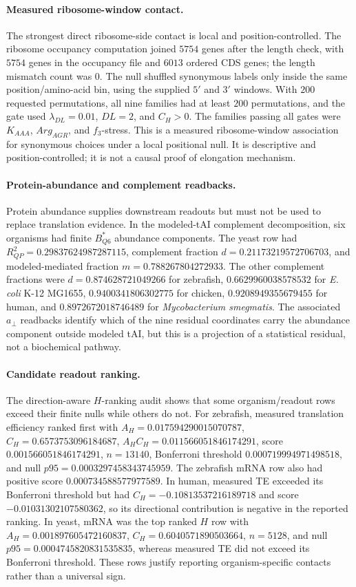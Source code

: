 \paragraph{Measured ribosome-window contact.}
The strongest direct ribosome-side contact is local and position-controlled. The ribosome occupancy computation joined $5754$ genes after the length check, with $5754$ genes in the occupancy file and $6013$ ordered CDS genes; the length mismatch count was $0$. The null shuffled synonymous labels only inside the same position/amino-acid bin, using the supplied $5'$ and $3'$ windows. With $200$ requested permutations, all nine families had at least $200$ permutations, and the gate used $\lambda_{DL}=0.01$, $DL=2$, and $C_H>0$. The families passing all gates were $K_{AAA}$, $Arg_{AGR}$, and $f_3$-stress. This is a measured ribosome-window association for synonymous choices under a local positional null. It is descriptive and position-controlled; it is not a causal proof of elongation mechanism.

\paragraph{Protein-abundance and complement readbacks.}
Protein abundance supplies downstream readouts but must not be used to replace translation evidence. In the modeled-tAI complement decomposition, six organisms had finite $B^{*}_{Q6}$ abundance components. The yeast row had $R^2_{QP}=0.29837624987287115$, complement fraction $d=0.21173219572706703$, and modeled-mediated fraction $m=0.788267804272933$. The other complement fractions were $d=0.874628721049266$ for zebrafish, $0.6629960038578532$ for \textit{E. coli} K-12 MG1655, $0.9400341806302775$ for chicken, $0.9208949355679455$ for human, and $0.8972672018746489$ for \textit{Mycobacterium smegmatis}. The associated $a_{\perp}$ readbacks identify which of the nine residual coordinates carry the abundance component outside modeled tAI, but this is a projection of a statistical residual, not a biochemical pathway.

\paragraph{Candidate readout ranking.}
The direction-aware $H$-ranking audit shows that some organism/readout rows exceed their finite nulls while others do not. For zebrafish, measured translation efficiency ranked first with $A_H=0.017594290015070787$, $C_H=0.6573753096184687$, $A_HC_H=0.011566051846174291$, score $0.001566051846174291$, $n=13140$, Bonferroni threshold $0.000719994971498518$, and null $p95=0.0003297458343745959$. The zebrafish mRNA row also had positive score $0.000734588577977589$. In human, measured TE exceeded its Bonferroni threshold but had $C_H=-0.10813537216189718$ and score $-0.01031302107580362$, so its directional contribution is negative in the reported ranking. In yeast, mRNA was the top ranked $H$ row with $A_H=0.001897605472160837$, $C_H=0.6040571890503664$, $n=5128$, and null $p95=0.0004745820831535835$, whereas measured TE did not exceed its Bonferroni threshold. These rows justify reporting organism-specific contacts rather than a universal sign.

